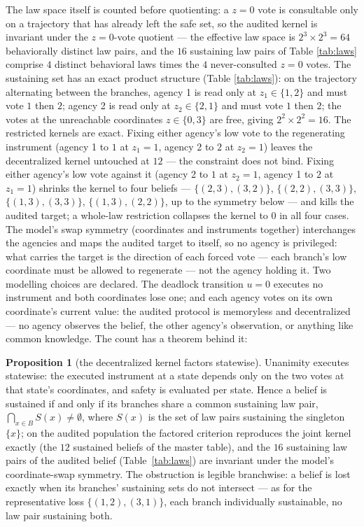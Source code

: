 \documentclass[10pt,twocolumn]{article}
\theoremstyle{definition}
\newtheorem{proposition}{Proposition}
\begin{document}
The law space itself is counted before quotienting: a \(z = 0\) vote is
consultable only on a trajectory that has already left the safe set, so
the audited kernel is invariant under the \(z{=}0\)-vote quotient ---
the effective law space is \(2^{3} \times 2^{3} = 64\) behaviorally
distinct law pairs, and the \(16\) sustaining law pairs of Table
\ref{tab:laws} comprise \(4\) distinct behavioral laws times the \(4\)
never-consulted \(z{=}0\) votes. The sustaining set has an
exact product structure (Table
\ref{tab:laws}): on the trajectory alternating between the branches,
agency 1 is read only at \(z_1 \in \{1, 2\}\) and must vote \(1\) then
\(2\); agency 2 is read only at \(z_2 \in \{2, 1\}\) and must vote
\(1\) then \(2\); the votes at the unreachable coordinates
\(z \in \{0, 3\}\) are free, giving \(2^{2} \times 2^{2} = 16\). The
restricted kernels are exact. Fixing either agency's low vote to the
regenerating instrument (agency 1 to \(1\) at \(z_1 = 1\), agency 2 to
\(2\) at \(z_2 = 1\)) leaves the decentralized kernel untouched at
\(12\) --- the constraint does not bind. Fixing either agency's low
vote against it (agency 2 to \(1\) at \(z_2 = 1\), agency 1 to \(2\)
at \(z_1 = 1\)) shrinks the kernel to four beliefs ---
\(\{(2,3),(3,2)\}\), \(\{(2,2),(3,3)\}\), \(\{(1,3),(3,3)\}\),
\(\{(1,3),(2,2)\}\), up to the symmetry below --- and kills the
audited target; a whole-law restriction collapses the kernel to \(0\)
in all four cases. The model's swap symmetry (coordinates and instruments
together) interchanges the agencies and maps the audited target to
itself, so no agency is privileged: what carries the target is the
direction of each forced vote --- each branch's low coordinate must be
allowed to regenerate --- not the agency holding it. Two modelling choices are declared. The deadlock transition
\(u = 0\) executes no instrument and both coordinates lose one; and
each agency votes on its own coordinate's current value: the audited
protocol is memoryless and decentralized --- no agency observes the
belief, the other agency's observation, or anything like common
knowledge. The count has a theorem behind it:

\begin{proposition}[the decentralized kernel factors statewise]
\label{prop:req}
Unanimity executes statewise: the executed instrument at a state depends
only on the two votes at that state's coordinates, and safety is
evaluated per state. Hence a belief is sustained if and only if its
branches share a common sustaining law pair,
\(\bigcap_{x \in B} S(x) \neq \emptyset\), where \(S(x)\) is the set
of law pairs sustaining the singleton \(\{x\}\); on the audited
population the factored criterion reproduces the joint kernel exactly
(the \(12\) sustained beliefs of the master table), and the \(16\)
sustaining law pairs of the audited belief
(Table~\ref{tab:laws}) are invariant under the model's coordinate-swap
symmetry. The obstruction is legible branchwise: a belief is lost
exactly when its branches' sustaining sets do not intersect --- as for
the representative loss \(\{(1,2),(3,1)\}\), each branch individually
sustainable, no law pair sustaining both.
\end{proposition}
\end{document}
